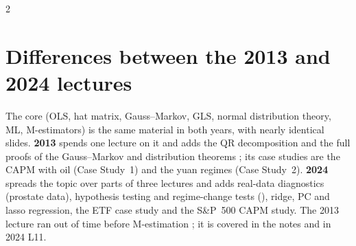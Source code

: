 \begin{paracol}{2}
\section{Differences between the 2013 and 2024 lectures}
\begin{coursenote}[2013 L6 vs 2024 L6, L8, L11]
The core (OLS, hat matrix, Gauss--Markov, GLS, normal distribution theory, ML, M-estimators) is the same material in
both years, with nearly identical slides. \textbf{2013} spends one lecture on it and adds the QR decomposition and
the full proofs of the Gauss--Markov and distribution theorems ; its case studies are the CAPM with
oil (Case Study~1) and the yuan regimes (Case Study~2). \textbf{2024} spreads the topic over parts of three lectures and
adds real-data diagnostics (prostate data), hypothesis testing and regime-change tests (), ridge, PC and lasso
regression, the ETF case study and the S\&P~500 CAPM study. The 2013 lecture ran out of time before M-estimation
; it is covered in the notes and in 2024 L11.
\end{coursenote}


\end{paracol}
